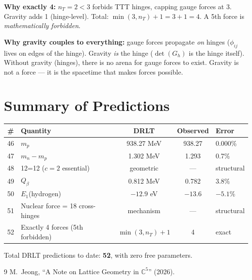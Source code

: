 \documentclass[12pt]{article}
\theoremstyle{remark}
\begin{document}
\textbf{Why exactly 4:} $n_T = 2 < 3$ forbids TTT hinges, capping gauge forces at 3. Gravity adds 1 (hinge-level). Total: $\min(3, n_T) + 1 = 3 + 1 = 4$. A 5th force is \emph{mathematically forbidden}.

\textbf{Why gravity couples to everything:} gauge forces propagate \emph{on} hinges ($\phi_{ij}$ lives on edges of the hinge). Gravity \emph{is} the hinge ($\det(G_h)$ is the hinge itself). Without gravity (hinges), there is no arena for gauge forces to exist. Gravity is not a force --- it is the spacetime that makes forces possible.

\section{Summary of Predictions}

\begin{center}
\begin{tabular}{clccl}
\hline
\# & Quantity & DRLT & Observed & Error \\
\hline
46 & $m_p$ & 938.27 MeV & 938.27 & 0.000\% \\
47 & $m_n - m_p$ & 1.302 MeV & 1.293 & 0.7\% \\
48 & 12=12 ($c=2$ essential) & geometric & --- & structural \\
49 & $Q_\beta$ & 0.812 MeV & 0.782 & 3.8\% \\
50 & $E_1$(hydrogen) & $-12.9$ eV & $-13.6$ & $-5.1$\% \\
51 & Nuclear force = 18 cross-hinges & mechanism & --- & structural \\
52 & Exactly 4 forces (5th forbidden) & $\min(3,n_T)+1$ & 4 & exact \\
\hline
\end{tabular}
\end{center}

\noindent Total DRLT predictions to date: \textbf{52}, with zero free parameters.

\begin{thebibliography}{9}
 M.~Jeong, ``A Note on Lattice Geometry in $\mathbb{C}^5$'' (2026).
\end{thebibliography}
\end{document}
